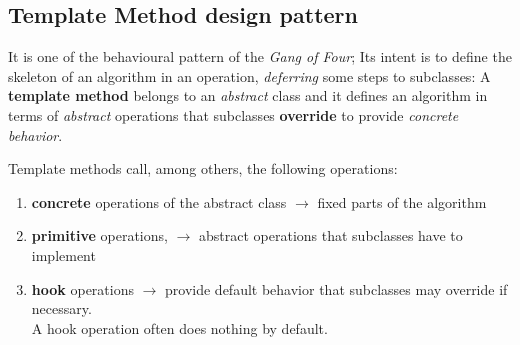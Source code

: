 
\subsection{Template Method design pattern}
It is one of the behavioural pattern of the \textit{Gang of Four};
Its intent is to define the skeleton of an algorithm in an operation,
\textit{deferring} some steps to subclasses:
A \textbf{template method} belongs to an \textit{abstract} class and it defines an algorithm in terms of \textit{abstract} operations that subclasses \textbf{override}
to provide \textit{concrete behavior}.

Template methods call, among others, the following operations:
\begin{enumerate}
   \item \textbf{concrete} operations of the abstract class $\longrightarrow$ fixed parts of the algorithm
   \item \textbf{primitive} operations, $\longrightarrow$ abstract operations that subclasses have to implement
   \item \textbf{hook} operations $\longrightarrow$ provide default behavior that subclasses may override if necessary.\\
   A hook operation often does nothing by default.
\end{enumerate}

